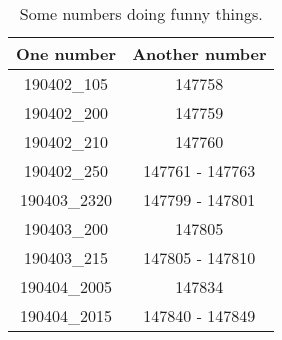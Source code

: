 \begin{table}[!h]
\centering
\begin{tabular}{|c|c|}
\hline
One number & Another number\\ \hline
190402\_105          & 147758          \\ \hline
190402\_200          & 147759          \\ \hline
190402\_210          & 147760          \\ \hline
190402\_250          & 147761 - 147763 \\ \hline
190403\_2320         & 147799 - 147801 \\ \hline
190403\_200          & 147805          \\ \hline
190403\_215          & 147805 - 147810 \\ \hline
190404\_2005         & 147834          \\ \hline
190404\_2015         & 147840 - 147849 \\ \hline
\end{tabular}
\caption{Some numbers doing funny things.}
\label{tab:some_stuff}
\end{table}